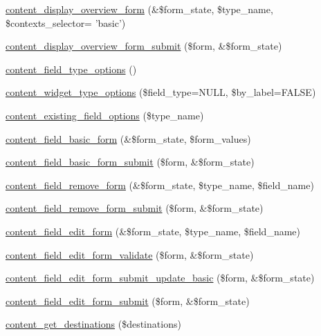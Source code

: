 \begin{CompactItemize}
\item 
\hyperlink{content_8admin_8inc_563e5f30b56e1175d33897e0fe634da1}{content\_\-display\_\-overview\_\-form} (\&\$form\_\-state, \$type\_\-name, \$contexts\_\-selector= 'basic')
\item 
\hyperlink{content_8admin_8inc_05a72014ccf1e0f3ea42aeeaaf671db1}{content\_\-display\_\-overview\_\-form\_\-submit} (\$form, \&\$form\_\-state)
\item 
\hyperlink{content_8admin_8inc_e950e13eb2d41c78f0c198b41f93b396}{content\_\-field\_\-type\_\-options} ()
\item 
\hyperlink{content_8admin_8inc_3999076285d87f726deafe9b22413b11}{content\_\-widget\_\-type\_\-options} (\$field\_\-type=NULL, \$by\_\-label=FALSE)
\item 
\hyperlink{content_8admin_8inc_8166e7b0e08ac7fd41f785a6e964525f}{content\_\-existing\_\-field\_\-options} (\$type\_\-name)
\item 
\hyperlink{content_8admin_8inc_cb416904beef692371c3dd7fc0ea292e}{content\_\-field\_\-basic\_\-form} (\&\$form\_\-state, \$form\_\-values)
\item 
\hyperlink{content_8admin_8inc_dd47be7ac19d3582f71bfd66c65bb95b}{content\_\-field\_\-basic\_\-form\_\-submit} (\$form, \&\$form\_\-state)
\item 
\hyperlink{content_8admin_8inc_26d040b449ba865d8a146e90eed14347}{content\_\-field\_\-remove\_\-form} (\&\$form\_\-state, \$type\_\-name, \$field\_\-name)
\item 
\hyperlink{content_8admin_8inc_f20e882fe0b838c602be760ccf857f2f}{content\_\-field\_\-remove\_\-form\_\-submit} (\$form, \&\$form\_\-state)
\item 
\hyperlink{content_8admin_8inc_ef005d4ee9d89ec487e171fd9c45a31c}{content\_\-field\_\-edit\_\-form} (\&\$form\_\-state, \$type\_\-name, \$field\_\-name)
\item 
\hyperlink{content_8admin_8inc_2265266a939085829c717a0b61bb3a7e}{content\_\-field\_\-edit\_\-form\_\-validate} (\$form, \&\$form\_\-state)
\item 
\hyperlink{content_8admin_8inc_785df3109e619884bd661692a560e88a}{content\_\-field\_\-edit\_\-form\_\-submit\_\-update\_\-basic} (\$form, \&\$form\_\-state)
\item 
\hyperlink{content_8admin_8inc_d9126913d3d2d3dcb9cedf55cb79a051}{content\_\-field\_\-edit\_\-form\_\-submit} (\$form, \&\$form\_\-state)
\item 
\hyperlink{content_8admin_8inc_3ed222838ecb9f23edef76f1429e0898}{content\_\-get\_\-destinations} (\$destinations)

\end{CompactItemize}
